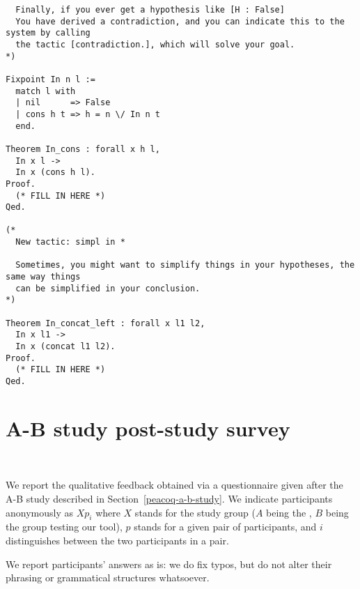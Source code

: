 \begin{verbatim}
  Finally, if you ever get a hypothesis like [H : False]
  You have derived a contradiction, and you can indicate this to the system by calling
  the tactic [contradiction.], which will solve your goal.
*)

Fixpoint In n l :=
  match l with
  | nil      => False
  | cons h t => h = n \/ In n t
  end.

Theorem In_cons : forall x h l,
  In x l ->
  In x (cons h l).
Proof.
  (* FILL IN HERE *)
Qed.

(*
  New tactic: simpl in *

  Sometimes, you might want to simplify things in your hypotheses, the same way things
  can be simplified in your conclusion.
*)

Theorem In_concat_left : forall x l1 l2,
  In x l1 ->
  In x (concat l1 l2).
Proof.
  (* FILL IN HERE *)
Qed.
\end{verbatim}

\clearpage

\section{\PeaCoq{} A-B study post-study survey}~\label{appendix-peacoq-a-b-study}

We report the qualitative feedback obtained via a questionnaire given after the
A-B study described in Section~\ref{peacoq-a-b-study}.  We indicate participants
anonymously as $Xp_{i}$ where $X$ stands for the study group ($A$ being the
, $B$ being the group testing our tool), $p$ stands for a
given pair of participants, and $i$ distinguishes between the two participants
in a pair.

We report participants' answers as is: we do fix typos, but do not alter their
phrasing or grammatical structures whatsoever.

\clearpage

